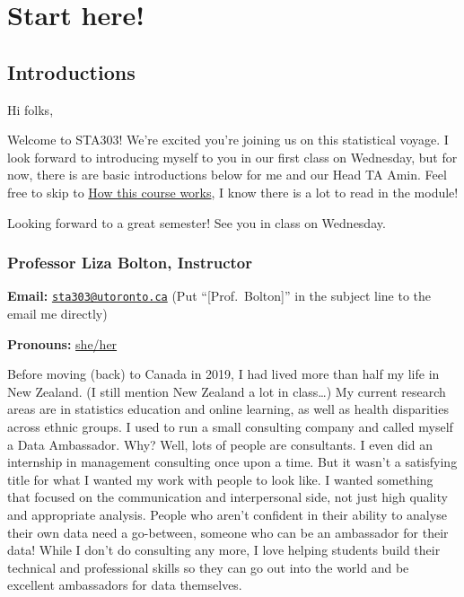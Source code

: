 \documentclass[
  openany]{book}
\begin{document}
\hypertarget{start-here}{%
\chapter{Start here!}\label{start-here}}

\hypertarget{introductions}{%
\section{Introductions}\label{introductions}}

Hi folks,

Welcome to STA303! We're excited you're joining us on this statistical voyage. I look forward to introducing myself to you in our first class on Wednesday, but for now, there is are basic introductions below for me and our Head TA Amin. Feel free to skip to \protect\hyperlink{howthiscourseworks}{How this course works}, I know there is a lot to read in the module!

Looking forward to a great semester! See you in class on Wednesday.

\hypertarget{professor-liza-bolton-instructor}{%
\subsection{Professor Liza Bolton, Instructor}\label{professor-liza-bolton-instructor}}

\textbf{Email:} \href{mailto:sta303@utoronto.ca}{\nolinkurl{sta303@utoronto.ca}} (Put ``{[}Prof.~Bolton{]}'' in the subject line to the email me directly)

\textbf{Pronouns:} \href{https://www.mypronouns.org/she-her}{she/her}

Before moving (back) to Canada in 2019, I had lived more than half my life in New Zealand. (I still mention New Zealand a lot in class\ldots) My current research areas are in statistics education and online learning, as well as health disparities across ethnic groups. I used to run a small consulting company and called myself a Data Ambassador. Why? Well, lots of people are consultants. I even did an internship in management consulting once upon a time. But it wasn't a satisfying title for what I wanted my work with people to look like. I wanted something that focused on the communication and interpersonal side, not just high quality and appropriate analysis. People who aren't confident in their ability to analyse their own data need a go-between, someone who can be an ambassador for their data! While I don't do consulting any more, I love helping students build their technical and professional skills so they can go out into the world and be excellent ambassadors for data themselves.
\end{document}
